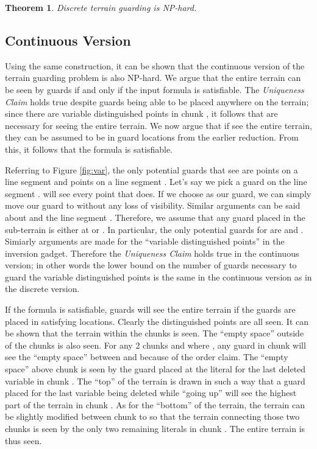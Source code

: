 \documentclass[11pt]{article}
\newtheorem{theorem}{Theorem}
\begin{document}
\begin{theorem}
Discrete terrain guarding is NP-hard.
\end{theorem}

\subsection{Continuous Version}
Using the same construction, it can be shown that the continuous version of the terrain guarding problem is also NP-hard.  We argue that the entire terrain can be seen by  guards if and only if the input formula is satisfiable.  The {\em Uniqueness Claim} holds true despite guards being able to be placed anywhere on the terrain; since there are  variable distinguished points in chunk , it follows that  are necessary for seeing the entire terrain.  We now argue that if  see the entire terrain, they can be assumed to be in guard locations from the earlier reduction.  From this, it follows that the formula is satisfiable.

Referring to Figure \ref{fig:var}, the only potential guards that see  are points on a line segment  and points on a line segment .  Let's say we pick a guard  on the line segment .   will see every point that  does.  If we choose  as our guard, we can simply move our guard to  without any loss of visibility.  Similar arguments can be said about  and the line segment .  Therefore, we assume that any guard placed in the sub-terrain  is either at  or . In particular, the only potential guards for  are  and .  Simiarly arguments are made for the ``variable distinguished points'' in the inversion gadget.  Therefore the {\em Uniqueness Claim} holds true in the continuous version; in other words the lower bound on the number of guards necessary to guard the variable distinguished points is the same in the continuous version as in the discrete version.  

If the formula is satisfiable,  guards will see the entire terrain if the guards are placed in satisfying locations.  Clearly the distinguished points are all seen.  It can be shown that the terrain within the chunks is seen.  The ``empty space'' outside of the chunks is also seen.  For any 2 chunks  and  where , any guard in chunk  will see the ``empty space'' between  and  because of the order claim.  The ``empty space'' above chunk  is seen by the guard placed at the literal for the last deleted variable in chunk .  The ``top'' of the terrain is drawn in such a way that a guard placed for the last variable being deleted while ``going up'' will see the highest part of the terrain in chunk .  As for the ``bottom'' of the terrain, the terrain can be slightly modified between chunk  to  so that the terrain connecting those two chunks is seen by the only two remaining literals in chunk .  The entire terrain is thus seen.
\end{document}
